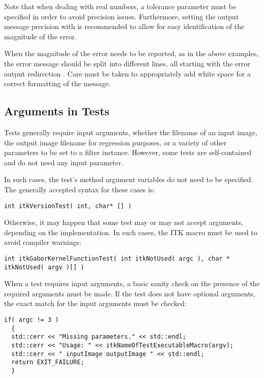 Note that when dealing with real numbers, a tolerance parameter must be
specified in order to avoid precision issues. Furthermore, setting the output
message precision with  is recommended to
allow for easy identification of the magnitude of the error.

When the magnitude of the error needs to be reported, as in the above examples,
the error message should be split into different lines, all starting with the
error output redirection . Care must be taken to
appropriately add white space for a correct formatting of the message.


\subsection{Arguments in Tests}
\label{subsec:ArgumentsInTests}

Tests generally require input arguments, whether the filename of an input image,
the output image filename for regression purposes, or a variety of other
parameters to be set to a filter instance. However, some tests are
self-contained and do not need any input parameter.

In such cases, the test's  method argument variables do not need to
be specified. The generally accepted syntax for these cases is:

\small
\begin{verbatim}
int itkVersionTest( int, char* [] )
\end{verbatim}
\normalsize

Otherwise, it may happen that some test may or may not accept arguments,
depending on the implementation. In such cases, the  ITK macro
must be used to avoid compiler warnings:

\small
\begin{verbatim}
int itkGaborKernelFunctionTest( int itkNotUsed( argc ), char * itkNotUsed( argv )[] )
\end{verbatim}
\normalsize

When a test requires input arguments, a basic sanity check on the presence of
the required arguments must be made. If the test does not have optional
arguments, the exact match for the input arguments must be checked:

\small
\begin{verbatim}
if( argc != 3 )
  {
  std::cerr << "Missing parameters." << std::endl;
  std::cerr << "Usage: " << itkNameOfTestExecutableMacro(argv);
  std::cerr << " inputImage outputImage " << std::endl;
  return EXIT_FAILURE;
  }
\end{verbatim}
\normalsize

